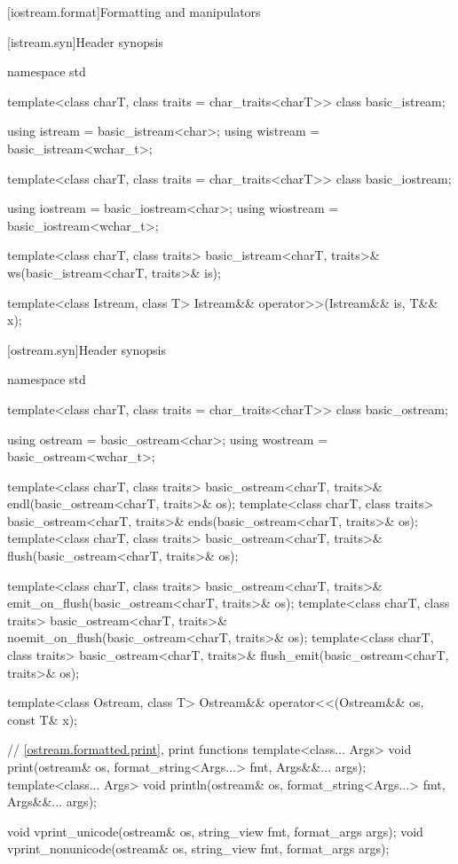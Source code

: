 [iostream.format]{Formatting and manipulators}

[istream.syn]{Header  synopsis}

%
\begin{codeblock}
namespace std {
  template<class charT, class traits = char_traits<charT>>
    class basic_istream;

  using istream  = basic_istream<char>;
  using wistream = basic_istream<wchar_t>;

  template<class charT, class traits = char_traits<charT>>
    class basic_iostream;

  using iostream  = basic_iostream<char>;
  using wiostream = basic_iostream<wchar_t>;

  template<class charT, class traits>
    basic_istream<charT, traits>& ws(basic_istream<charT, traits>& is);

  template<class Istream, class T>
    Istream&& operator>>(Istream&& is, T&& x);
}
\end{codeblock}

%
%
%
%

[ostream.syn]{Header  synopsis}

%
\begin{codeblock}
namespace std {
  template<class charT, class traits = char_traits<charT>>
    class basic_ostream;

  using ostream  = basic_ostream<char>;
  using wostream = basic_ostream<wchar_t>;

  template<class charT, class traits>
    basic_ostream<charT, traits>& endl(basic_ostream<charT, traits>& os);
  template<class charT, class traits>
    basic_ostream<charT, traits>& ends(basic_ostream<charT, traits>& os);
  template<class charT, class traits>
    basic_ostream<charT, traits>& flush(basic_ostream<charT, traits>& os);

  template<class charT, class traits>
    basic_ostream<charT, traits>& emit_on_flush(basic_ostream<charT, traits>& os);
  template<class charT, class traits>
    basic_ostream<charT, traits>& noemit_on_flush(basic_ostream<charT, traits>& os);
  template<class charT, class traits>
    basic_ostream<charT, traits>& flush_emit(basic_ostream<charT, traits>& os);

  template<class Ostream, class T>
    Ostream&& operator<<(Ostream&& os, const T& x);

  // \ref{ostream.formatted.print}, print functions
  template<class... Args>
    void print(ostream& os, format_string<Args...> fmt, Args&&... args);
  template<class... Args>
    void println(ostream& os, format_string<Args...> fmt, Args&&... args);

  void vprint_unicode(ostream& os, string_view fmt, format_args args);
  void vprint_nonunicode(ostream& os, string_view fmt, format_args args);
}
\end{codeblock}


